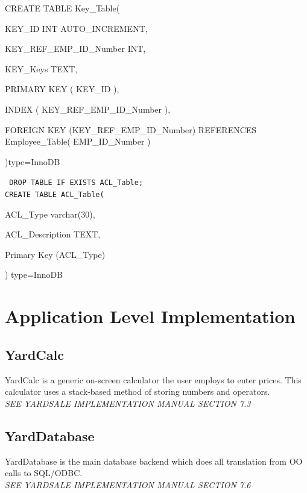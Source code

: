 \documentclass{report}
\begin{document}
\begin{itemize}
{        CREATE TABLE Key\_Table(
        \begin{list}{}
            \item{KEY\_ID                          INT AUTO\_INCREMENT,}
            \item{KEY\_REF\_EMP\_ID\_Number        INT,}
            \item{KEY\_Keys                        TEXT,}
            \item{PRIMARY KEY ( KEY\_ID ),}
            \item{INDEX ( KEY\_REF\_EMP\_ID\_Number ),}
            \item{FOREIGN KEY (KEY\_REF\_EMP\_ID\_Number) REFERENCES Employee\_Table( EMP\_ID\_Number )}
        \end{list}
        )type=InnoDB\\
        }

        {\tt\small
        DROP TABLE IF EXISTS ACL\_Table;\\

        CREATE TABLE ACL\_Table(
        \begin{list}{}
            \item{ACL\_Type varchar(30),}
            \item{ACL\_Description TEXT,}
            \item{Primary Key (ACL\_Type)}
        \end{list}
        ) type=InnoDB\\
        }

    \section{Application Level Implementation}

        \subsection{YardCalc}
        YardCalc is a generic on-screen calculator the user employs to
        enter prices.  This calculator uses a stack-based method of
        storing numbers and operators.\\
        {\sl SEE YARDSALE IMPLEMENTATION MANUAL SECTION 7.3}

        \subsection{YardDatabase}
        YardDatabase is the main database backend which does all
        translation from OO calls to SQL/ODBC.\\
        {\sl SEE YARDSALE IMPLEMENTATION MANUAL SECTION 7.6}


\end{itemize}
\end{document}
